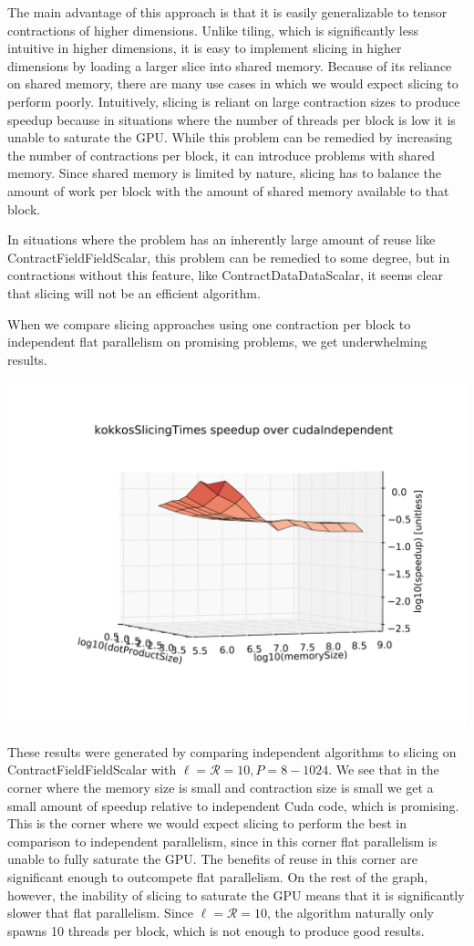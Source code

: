 	The main advantage of this approach is that it is easily generalizable to tensor contractions of higher dimensions. Unlike tiling, which is significantly less intuitive in higher dimensions, it is easy to implement slicing in higher dimensions by loading a larger slice into shared memory. Because of its reliance on shared memory, there are many use cases in which we would expect slicing to perform poorly. Intuitively, slicing is reliant on large contraction sizes to produce speedup because in situations where the number of threads per block is low it is unable to saturate the GPU. While this problem can be remedied by increasing the number of contractions per block, it can introduce problems with shared memory. Since shared memory is limited by nature, slicing has to balance the amount of work per block with the amount of shared memory available to that block.
	
	In situations where the problem has an inherently large amount of reuse like ContractFieldFieldScalar, this problem can be remedied to some degree, but in contractions without this feature, like ContractDataDataScalar, it seems clear that slicing will not be an efficient algorithm. 
	
When we compare slicing approaches using one contraction per block to independent flat parallelism on promising problems, we get underwhelming results. 

    \includegraphics[scale = .17]{slicingvsindependent}

These results were generated by comparing independent algorithms to slicing on ContractFieldFieldScalar with $\ell = \mathcal{R} = 10, P = 8 - 1024$. We see that in the corner where the memory size is small and contraction size is small we get a small amount of speedup relative to independent Cuda code, which is promising. This is the corner where we would expect slicing to perform the best in comparison to independent parallelism, since in this corner flat parallelism is unable to fully saturate the GPU. The benefits of reuse in this corner are significant enough to outcompete flat parallelism. On the rest of the graph, however, the inability of slicing to saturate the GPU means that it is significantly slower that flat parallelism. Since $\ell = \mathcal{R} = 10$, the algorithm naturally only spawns 10 threads per block, which is not enough to produce good results. 

